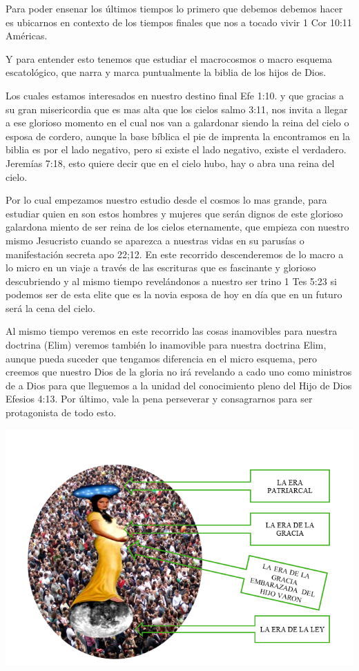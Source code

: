 \documentclass[]{book}
\begin{document}
Para poder ensenar los últimos tiempos lo primero que debemos debemos hacer es ubicarnos en contexto de los tiempos finales que nos a tocado vivir 1 Cor 10:11 Américas.

Y para entender esto tenemos que estudiar el macrocosmos o macro esquema escatológico, que narra y marca puntualmente la biblia de los hijos de Dios.

Los cuales estamos interesados en nuestro destino final Efe 1:10. y que gracias a su gran misericordia que es mas alta que los cielos salmo 3:11, nos invita a llegar a ese glorioso momento en el cual nos van a galardonar siendo la reina del cielo o esposa de cordero, aunque la base bíblica el pie de imprenta la encontramos en la biblia es por el lado negativo, pero si existe el lado negativo, existe el verdadero. Jeremías 7:18, esto quiere decir que en el cielo hubo, hay o abra una reina del cielo.

Por lo cual empezamos nuestro estudio desde el cosmos lo mas grande, para estudiar quien en son estos hombres y mujeres que serán dignos de este glorioso galardona miento de ser reina de los cielos eternamente, que empieza con nuestro mismo Jesucristo cuando se aparezca a nuestras vidas en su parusías o manifestación secreta apo 22;12. En este recorrido descenderemos de lo macro a lo micro en un viaje a través de las escrituras que es fascinante y glorioso descubriendo y al mismo tiempo revelándonos a nuestro ser trino 1 Tes 5:23 si podemos ser de esta elite que es la novia esposa de hoy en día que en un futuro será la cena del cielo.

Al mismo tiempo veremos en este recorrido las cosas inamovibles para nuestra doctrina (Elim) veremos también lo inamovible para nuestra doctrina Elim, aunque pueda suceder que tengamos diferencia en el micro esquema, pero creemos que nuestro Dios de la gloria no irá revelando a cado uno como ministros de a Dios para que lleguemos a la unidad del conocimiento pleno del Hijo de Dios Efesios 4:13.
Por último, vale la pena perseverar y consagrarnos para ser protagonista de todo esto.

\includegraphics{static/iglesia_universal.png}
\end{document}
